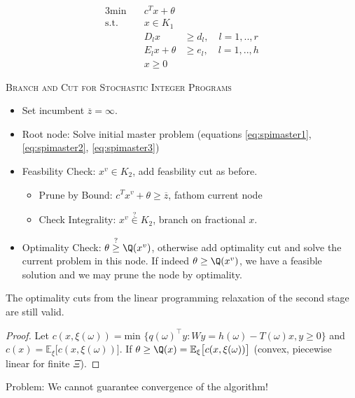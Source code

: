\begin{alignat}{3}
\textrm{min}  \quad & c^Tx +\theta & \label{eq:spimaster1} \\
\textrm{s.t.} \quad & x\in K_1  & \label{eq:spimaster2} \\
                    & D_l x           & \geq d_l, \quad l = 1,..,r \\
                    & E_l x  + \theta & \geq e_l, \quad l = 1,..,h \\
                    & x \geq 0 \label{eq:spimaster3} 
\end{alignat}

\textsc{Branch and Cut for Stochastic Integer Programs}

\begin{itemize}
\item Set incumbent $\overline{z} = \infty$.
\item Root node: Solve initial master problem (equations \ref{eq:spimaster1}, 
\ref{eq:spimaster2}, \ref{eq:spimaster3})
\item Feasbility Check: $x^v \in K_2$, add feasbility cut as before.
  \begin{itemize}
     \item Prune by Bound: $c^Tx^v + \theta \geq \overline{z}$, fathom current node
     \item Check Integrality: $x^v \stackrel{?}{\in} K_2$, branch on fractional $x$.
\end{itemize}
\item Optimality Check: $\theta \stackrel{?}{\geq} \Q(x^v)$, otherwise add optimality
cut and solve the current problem in this node. If indeed $\theta \geq \Q(x^v)$,
we have a feasible solution and we may prune the node by optimality.
\end{itemize}

\begin{proposition}
The optimality cuts from the linear programming relaxation of the second stage are
still valid.
\end{proposition}

\begin{proof}\hfill\break
Let $c(x,\xi(\omega)) = \textrm{min }\{q(\omega)^\top y : Wy = h(\omega)-T(\omega)x, y\geq 0 \}$
and $c(x) = \mathbb{E}_\xi \big[ c(x,\xi(\omega)) \big]$. If $\theta \geq \Q(x) = \mathbb{E}_\xi
\big[ c(x,\xi(\omega)) \big]$ (convex, piecewise linear for finite $\Xi$).
\end{proof}

Problem: We cannot guarantee convergence of the algorithm!

